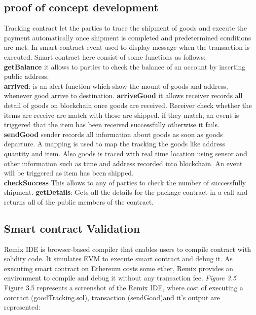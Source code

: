 \subsection{proof of concept development }
Tracking contract let the parties to trace the shipment of goods and execute the payment automatically once shipment is completed and predetermined conditions are met. In smart contract event used to display message when the transaction is executed. Smart contract here consist of some functions as follows:\\
\textbf{getBalance} it allows to parties to check the balance of an account by inserting public address.\\
\textbf{arrived}: is an alert function which show the mount of goods and address, whenever good arrive to destination.
\textbf{arriveGood} it allows receiver records all detail of goods on blockchain once goods are received. Receiver check whether the items are receive are match with those are shipped. if they match, an event is triggered that the item has been received successfully otherwise it fails.\\
\textbf{sendGood} sender records all information about goods as soon as goods departure. A mapping is used to map the tracking the goods like address quantity and item. Also goods is traced with real time location using sensor and other information such as time and address recorded into blockchain. An event will be triggered as item has been shipped.\\
\textbf{checkSuccess} This allows to any of parties to check the number of successfully shipment.
\textbf{getDetails}: Gets all the details for the package contract in a call and returns all of the public members of the contract. 

\subsection{Smart contract Validation}
Remix IDE is browser-based compiler that enables users  to compile contract  with solidity code. It simulates EVM  to execute smart contract and debug it.  As executing smart contract on Ethereum costs some
ether, Remix provides an environment to compile and debug it without any transaction fee. \textit{Figure 3.5} Figure 3.5 represents a screenshot of the Remix IDE, where  cost of executing a
contract (goodTracking.sol), transaction (sendGood)and it's output are represented: 
  


